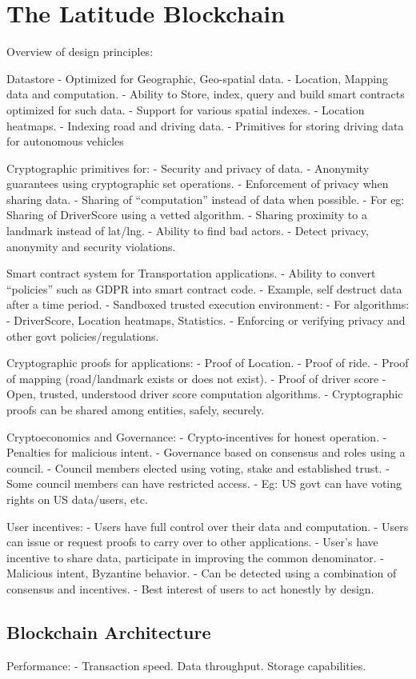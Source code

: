\section{The Latitude Blockchain}\label{sec:design}


Overview of design principles:

Datastore
 - Optimized for Geographic, Geo-spatial data.
 - Location, Mapping data and computation.
 - Ability to Store, index, query and build smart contracts optimized for such data.
 - Support for various spatial indexes.
 - Location heatmaps.
 - Indexing road and driving data.
 - Primitives for storing driving data for autonomous vehicles

Cryptographic primitives for:
 - Security and privacy of data.
 - Anonymity guarantees using cryptographic set operations.
 - Enforcement of privacy when sharing data.
 - Sharing of “computation” instead of data when possible.
 - For eg: Sharing of DriverScore using a vetted algorithm.
 - Sharing proximity to a landmark instead of lat/lng.
 - Ability to find bad actors.
 - Detect privacy, anonymity and security violations.


Smart contract system for Transportation applications.
 - Ability to convert “policies” such as GDPR into smart contract code.
 - Example, self destruct data after a time period.
 - Sandboxed trusted execution environment:
 - For algorithms:
   - DriverScore, Location heatmaps, Statistics.
   - Enforcing or verifying privacy and other govt policies/regulations.

Cryptographic proofs for applications:
 - Proof of Location. 
 - Proof of ride. 
 - Proof of mapping 
      (road/landmark exists or does not exist).
 - Proof of driver score 
 - Open, trusted, understood driver score computation algorithms.
 - Cryptographic proofs can be shared among entities, safely, securely.


Cryptoeconomics and Governance:
 - Crypto-incentives for honest operation.
 - Penalties for malicious intent.
 - Governance based on consensus and roles using a council.
 - Council members elected using voting, stake and established trust.
 - Some council members can have restricted access.
 - Eg: US govt can have voting rights on US data/users, etc.

User incentives:
 - Users have full control over their data and computation.
 - Users can issue or request proofs to carry over to other applications.
 - User’s have incentive to share data, participate in improving the common denominator.
 - Malicious intent, Byzantine behavior.
   - Can be detected using a combination of consensus and incentives.
   - Best interest of users to act honestly by design.

\subsection{Blockchain Architecture}



Performance:
- Transaction speed. Data throughput. Storage capabilities.
